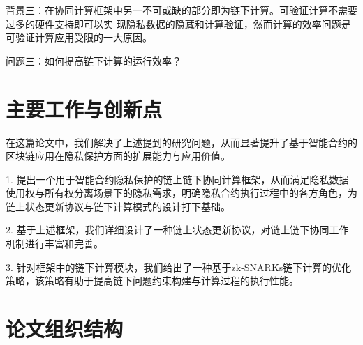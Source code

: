 背景三：在协同计算框架中另一不可或缺的部分即为链下计算。可验证计算不需要过多的硬件支持即可以实
现隐私数据的隐藏和计算验证，然而计算的效率问题是可验证计算应用受限的一大原因。

问题三：如何提高链下计算的运行效率？

\section{主要工作与创新点}

在这篇论文中，我们解决了上述提到的研究问题，从而显著提升了基于智能合约的区块链应用在隐私保护方面的扩展能力与应用价值。

1. 提出一个用于智能合约隐私保护的链上链下协同计算框架，从而满足隐私数据使用权与所有权分离场景下的隐私需求，明确隐私合约执行过程中的各方角色，为链上状态更新协议与链下计算模式的设计打下基础。

2. 基于上述框架，我们详细设计了一种链上状态更新协议，对链上链下协同工作机制进行丰富和完善。

3. 针对框架中的链下计算模块，我们给出了一种基于zk-SNARKs链下计算的优化策略，该策略有助于提高链下问题约束构建与计算过程的执行性能。

\section{论文组织结构}

